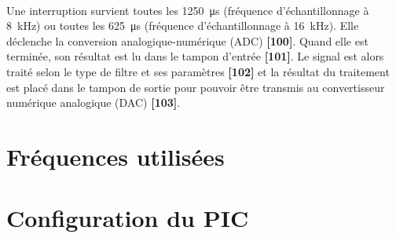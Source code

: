 \documentclass{article}
\begin{document}
    \paragraph{}
    Une interruption survient toutes les \SI{1250}{\micro\second} (fréquence d'échantillonnage à \SI{8}{\kilo\hertz}) ou toutes les \SI{625}{\micro\second} (fréquence d'échantillonnage à \SI{16}{\kilo\hertz}). Elle déclenche la conversion analogique-numérique (ADC) \textbf{[100]}. Quand elle est terminée, son résultat est lu dans le tampon d'entrée \textbf{[101]}. Le signal est alors traité selon le type de filtre et ses paramètres \textbf{[102]} et la résultat du traitement est placé dans le tampon de sortie pour pouvoir être transmis au convertisseur numérique analogique (DAC) \textbf{[103]}.










    \newpage
    \section{Fréquences utilisées}

    \section{Configuration du PIC}
    \label{section:configuration}
\end{document}
